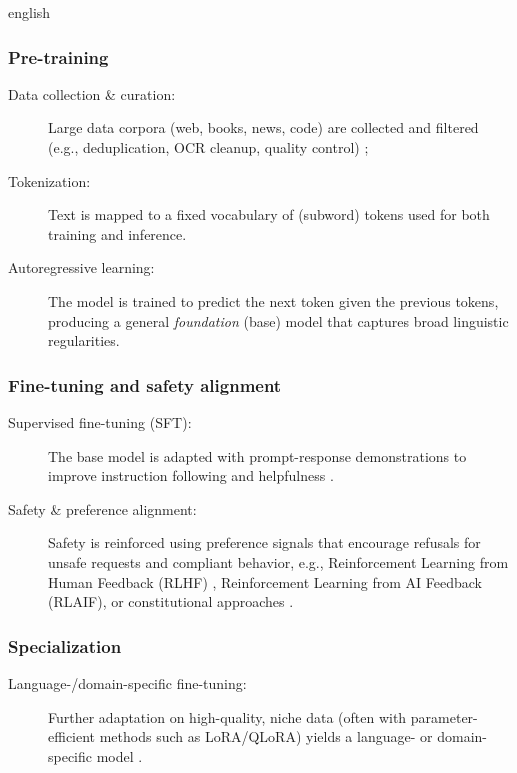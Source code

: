 \begin{otherlanguage*}{english}
\subsubsection{Pre-training}
\begin{description}
  \item[Data collection \& curation:] Large data corpora (web, books, news, code) are collected and filtered (e.g., deduplication, OCR cleanup, quality control) \cite{duSurveyLLMDatasets2024};
  \item[Tokenization:] Text is mapped to a fixed vocabulary of (subword) tokens used for both training and inference.
  \item[Autoregressive learning:] The model is trained to predict the next token given the previous tokens, producing a general \emph{foundation} (base) model that captures broad linguistic regularities.
\end{description}

\subsubsection{Fine-tuning and safety alignment}
\begin{description}
  \item[Supervised fine-tuning (SFT):] The base model is adapted with prompt-response demonstrations to improve instruction following and helpfulness \cite{ouyangTrainingLanguageModels2022}.
  \item[Safety \& preference alignment:] Safety is reinforced using preference signals that encourage refusals for unsafe requests and compliant behavior, e.g., Reinforcement Learning from Human Feedback (RLHF) \cite{baiTrainingHelpfulHarmless2022}, Reinforcement Learning from AI Feedback (RLAIF), or constitutional approaches \cite{baiConstitutionalAIHarmlessness2022}.
\end{description}

\subsubsection{Specialization}
\begin{description}
  \item[Language-/domain-specific fine-tuning:] Further adaptation on high-quality, niche data (often with parameter-efficient methods such as LoRA/QLoRA) yields a language- or domain-specific model \cite{huLoRALowRankAdaptation2021, dettmersQLoRAEfficientFinetuning2023a}.
\end{description}


\end{otherlanguage*}
